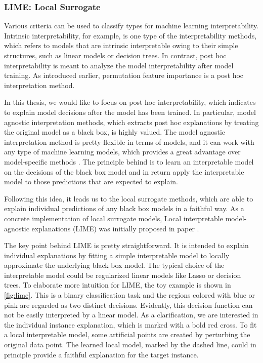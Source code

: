 \subsubsection{LIME: Local Surrogate}

Various criteria can be used to classify types for machine learning interpretability. Intrinsic interpretability, for example, is one type of the interpretability methods, which refers to models that are intrinsic interpretable owing to their simple structures, such as linear models or decision trees. In contrast, post hoc interpretability is meant to analyze the model interpretability after model training. As introduced earlier, permutation feature importance is a post hoc interpretation method. 

In this thesis, we would like to focus on post hoc interpretability, which indicates to explain model decisions after the model has been trained. In particular, model agnostic interpretation methods, which extracts post hoc explanations by treating the original model as a black box, is highly valued. The model agnostic interpretation method is pretty flexible in terms of models, and it can work with any type of machine learning models, which provides a great advantage over model-specific methods \cite{ribeiro2016model}. The principle behind is to learn an interpretable model on the decisions of the black box model and in return apply the interpretable model to those predictions that are expected to explain.  

Following this idea, it leads us to the local surrogate methods, which are able to explain individual predictions of any black box models in a faithful way. As a concrete implementation of local surrogate models, Local interpretable model-agnostic explanations (LIME) was initially proposed in paper \cite{ribeiro2016should}. 

The key point behind LIME is pretty straightforward. It is intended to explain individual explanations by fitting a simple interpretable model to locally approximate the underlying black box model. The typical choice of the interpretable model could be regularized linear models like Lasso or decision trees. To elaborate more intuition for LIME, the toy example is shown in \ref{fig:lime}. This is a binary classification task and the regions colored with blue or pink are regarded as two distinct decisions. Evidently, this decision function can not be easily interpreted by a linear model. As a clarification, we are interested in the individual instance explanation, which is marked with a bold red cross. To fit a local interpretable model, some artificial points are created by perturbing the original data point. The learned local model, marked by the dashed line, could in principle provide a faithful explanation for the target instance. 

